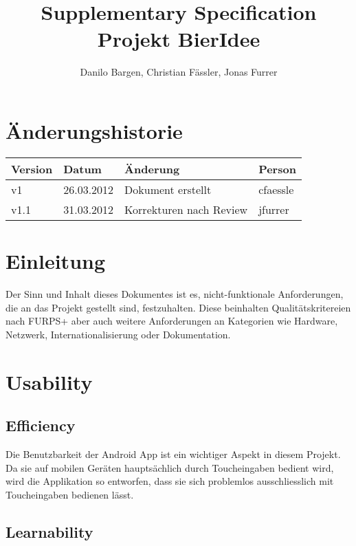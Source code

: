 \documentclass[10pt,a4paper]{scrartcl}
\author{Danilo Bargen, Christian Fässler, Jonas Furrer}
\title{Supplementary Specification \\Projekt BierIdee}
\begin{document}
\begin{titlepage}
	\maketitle
	\vspace{120mm}
	\thispagestyle{empty} %
\end{titlepage}
\newpage

\tableofcontents
\newpage

\section{Änderungshistorie}
\begin{tabular}{p{}p{}p{}p{}}
\toprule
\textbf{Version} & \textbf{Datum} & \textbf{Änderung} & \textbf{Person} \\  
\midrule
v1 & 26.03.2012 & Dokument erstellt & cfaessle \\  
\hline 
v1.1 & 31.03.2012 & Korrekturen nach Review & jfurrer \\
\bottomrule
\end{tabular} 
\newpage

\section{Einleitung}

Der Sinn und Inhalt dieses Dokumentes ist es, nicht-funktionale Anforderungen, die an das Projekt gestellt sind, festzuhalten. Diese beinhalten Qualitätskritereien nach FURPS+ aber auch weitere Anforderungen an Kategorien wie Hardware, Netzwerk, Internationalisierung oder Dokumentation.

\section{Usability}

	\subsection{Efficiency}

	Die Benutzbarkeit der Android App ist ein wichtiger Aspekt in diesem Projekt. Da sie auf mobilen Geräten hauptsächlich durch Toucheingaben bedient wird, wird die Applikation so entworfen, dass sie sich problemlos ausschliesslich mit Toucheingaben bedienen lässt.

	\subsection{Learnability}
\end{document}
